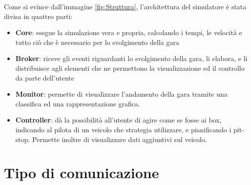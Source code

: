 Come si evince dall'immagine \ref{fig:Struttura}, l'architettura del simulatore è stata divisa in quattro parti:
\begin{itemize}
 \item \textbf{Core}: esegue la simulazione vera e propria, calcolando i tempi, le velocità e tutto ciò che è necessario per lo svolgimento della gara
 \item \textbf{Broker}: riceve gli eventi riguardanti lo svolgimento della gara, li elabora, e li distribuisce agli elementi che ne permettono la visualizzazione ed il controllo da parte dell’utente
 \item \textbf{Monitor}: permette di visualizzare l’andamento della gara tramite una classifica ed una rappresentazione grafica.
 \item \textbf{Controller}: dà la possibilità all’utente di agire come se fosse ai box, indicando al pilota di un veicolo che strategia utilizzare, e pianificando i pit-stop. Permette inoltre di visualizzare dati aggiuntivi sul veicolo.
\end{itemize}


\section{Tipo di comunicazione}


